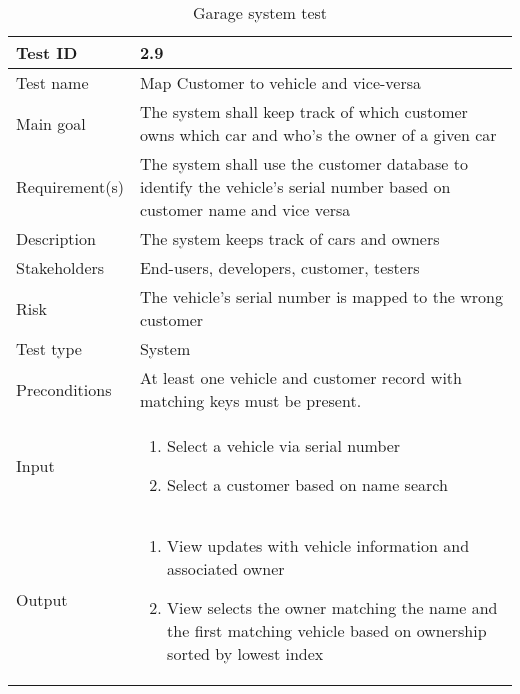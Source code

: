 \begin{table}[H]
\centering
\caption{Garage system test}
\begin{tabularx}{1.0\textwidth}{
    |p{}     %
    |p{}|    %
}
\hline

Test ID
& 2.9
\\
\hline

Test name
& Map Customer to vehicle and vice-versa
\\
\hline

Main goal
& The system shall keep track of which customer owns which car and who's the owner of a given car
\\
\hline

Requirement(s)
& The system shall use the customer database to identify the vehicle's serial number based on customer name and vice versa
\\
\hline

Description
& The system keeps track of cars and owners
\\
\hline

Stakeholders
& End-users, developers, customer, testers
\\
\hline

Risk
& The vehicle's serial number is mapped to the wrong customer
\\
\hline

Test type
& System
\\
\hline

Preconditions
& At least one vehicle and customer record with matching keys must be present.
\\
\hline

Input
& \begin{enumerate}
    \item Select a vehicle via serial number
    \item Select a customer based on name search
\end{enumerate}
\\
\hline

Output
& \begin{enumerate}
    \item View updates with vehicle information and associated owner
    \item View selects the owner matching the name and the first matching vehicle based on ownership sorted by lowest index
\end{enumerate}
\\
\hline


\end{tabularx}
\end{table}
